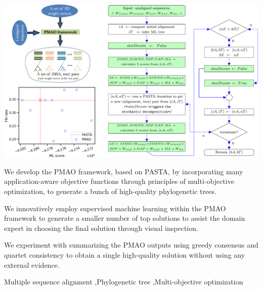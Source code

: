 \documentclass[a4paper,fleqn, review]{cas-dc}
\begin{document}
\begin{graphicalabstract}
	\includegraphics[width=1.0\textwidth]{graphical-abs.pdf}
\end{graphicalabstract}

\begin{highlights}
	\item We develop the PMAO framework, based on PASTA, by incorporating many application-aware objective functions through principles of multi-objective optimization, to generate a bunch of high-quality phylogenetic trees.
	\item We innovatively employ supervised machine learning within the PMAO framework to generate a smaller number of top solutions to assist the domain expert in choosing the final solution through visual inspection.
	\item We experiment with summarizing the PMAO outputs using greedy consensus and quartet consistency to obtain a single high-quality solution without using any external evidence.
\end{highlights}

\begin{keywords}
	Multiple sequence alignment \sep Phylogenetic tree \sep Multi-objective optimization
\end{keywords}



\maketitle
\end{document}
